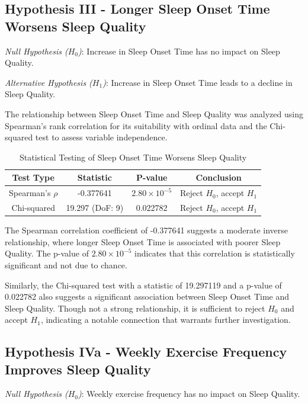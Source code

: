 \documentclass[conference]{IEEEtran}
\begin{document}
\subsection*{Hypothesis III - Longer Sleep Onset Time Worsens Sleep Quality}
\textit{Null Hypothesis (\(H_0\))}: Increase in Sleep Onset Time has no impact on Sleep Quality.

\textit{Alternative Hypothesis (\(H_1\))}: Increase in Sleep Onset Time leads to a decline in Sleep Quality.

The relationship between Sleep Onset Time and Sleep Quality was analyzed using Spearman's rank correlation for its suitability with ordinal data and the Chi-squared test to assess variable independence.

\begin{table}[ht]
\centering
\caption{Statistical Testing of Sleep Onset Time Worsens Sleep Quality}
\label{tab:hypothesis3}
\begin{tabular}{|c|c|c|c|}
\hline
\textbf{Test Type} & \textbf{Statistic} & \textbf{P-value} & \textbf{Conclusion} \\
\hline
Spearman's \(\rho\) & -0.377641 & \(2.80 \times 10^{-5}\) & Reject \(H_0\), accept \(H_1\) \\
\hline
Chi-squared & 19.297 (DoF: 9) & 0.022782 & Reject \(H_0\), accept \(H_1\) \\
\hline
\end{tabular}
\end{table}

The Spearman correlation coefficient of -0.377641 suggests a moderate inverse relationship, where longer Sleep Onset Time is associated with poorer Sleep Quality. The p-value of \(2.80 \times 10^{-5}\) indicates that this correlation is statistically significant and not due to chance.

Similarly, the Chi-squared test with a statistic of 19.297119 and a p-value of 0.022782 also suggests a significant association between Sleep Onset Time and Sleep Quality. Though not a strong relationship, it is sufficient to reject \(H_0\) and accept \(H_1\), indicating a notable connection that warrants further investigation.


\subsection*{Hypothesis IVa - Weekly Exercise Frequency Improves Sleep Quality}
\textit{Null Hypothesis (\(H_0\))}: Weekly exercise frequency has no impact on Sleep Quality.
\end{document}
